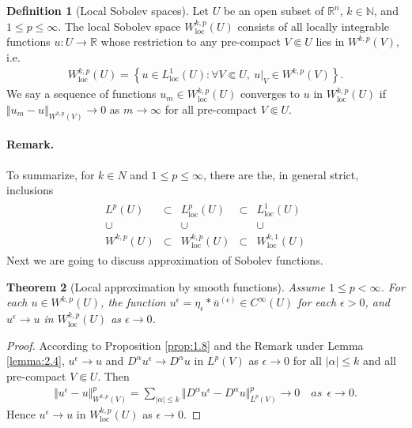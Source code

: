 \documentclass{article}
\numberwithin{equation}{section}
\newcommand{\bbN}{\mathbb{N}}
\newcommand{\bbR}{\mathbb{R}}
\newcommand{\loc}{\mathrm{loc}}
\newcommand{\ol}{\overline}
\theoremstyle{plain}
\newtheorem{theorem}{Theorem}[section]
\theoremstyle{definition}
\newtheorem{definition}[theorem]{Definition}
\begin{document}
\begin{definition}[Local Sobolev spaces]\label{Sobolevloc}
Let $U$ be an open subset of $\bbR^n$, $k\in\bbN$, and $1\leq p\leq\infty$. The local Sobolev space $W^{k,p}_\loc(U)$ consists of all locally integrable
functions $u:U\to\bbR$ whose restriction to any pre-compact $V\Subset U$ lies in $W^{k,p}(V)$, i.e.
\begin{align*}
	W_\loc^{k,p}(U)=\left\{u\in L^1_\loc(U):\forall V\Subset U,\ u|_V\in W^{k,p}(V)\right\}.
\end{align*}
We say a sequence of functions $u_m\in W_\loc^{k,p}(U)$ converges to $u$ in $W_\loc^{k,p}(U)$ if $\Vert u_m -u\Vert_{W^{k,p}(V)}\to 0$ as $m\to\infty$ for all pre-compact $V\Subset U$.
\end{definition}
\paragraph{Remark.} To summarize, for $k\in N$ and $1\leq p\leq\infty$, there are the, in general strict, inclusions
\begin{align*}
\begin{matrix}
	L^p(U) &\subset &L^p_\loc(U) &\subset &L^1_\loc(U)\\
	\cup & ~ & \cup & ~ & \cup\\
	W^{k,p}(U) &\subset & W^{k,p}_\loc(U) &\subset & W^{k,1}_\loc(U)
\end{matrix}
\end{align*}
Next we are going to discuss approximation of Sobolev functions.

\begin{theorem}[Local approximation by smooth functions]\label{thm:2.10}
Assume $1\leq p<\infty$. For each $u\in W^{k,p}(U)$, the function $u^\epsilon=\eta_\epsilon*\ol{u}^{(\epsilon)}\in C^\infty(U)$ for each $\epsilon>0$, and $u^\epsilon\to u$ in $W_\loc^{k,p}(U)$ as $\epsilon\to 0$.
\end{theorem}
\begin{proof}
According to Proposition \ref{prop:1.8} and the Remark under Lemma \ref{lemma:2.4}, $u^\epsilon\to u$ and $D^\alpha u^\epsilon\to D^\alpha u$ in $L^p(V)$ as $\epsilon\to 0$ for all $\vert\alpha\vert\leq k$ and all pre-compact $V\Subset U$. Then
\begin{align}
	\Vert u^\epsilon-u\Vert_{W^{k,p}(V)}^p=\sum_{\vert\alpha\vert\leq k}\Vert D^\alpha u^\epsilon-D^\alpha u\Vert_{L^p(V)}^p\to 0\quad as\ \ \epsilon\to 0.\label{eq:2.3}
\end{align}
Hence $u^\epsilon\to u$ in $W_\loc^{k,p}(U)$ as $\epsilon\to 0$.
\end{proof}
\end{document}

